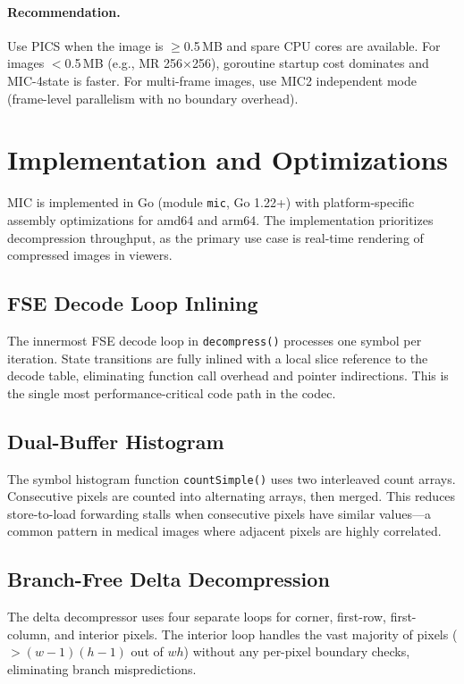 \documentclass[11pt,twocolumn]{article}
\begin{document}
\paragraph{Recommendation.}
Use PICS when the image is $\geq$0.5\,MB and spare CPU cores are available.
For images $<$0.5\,MB (e.g., MR 256$\times$256), goroutine startup cost dominates and MIC-4state is faster.
For multi-frame images, use MIC2 independent mode (frame-level parallelism with no boundary overhead).

\section{Implementation and Optimizations}
\label{sec:implementation}

MIC is implemented in Go (module \texttt{mic}, Go 1.22+) with platform-specific assembly optimizations for amd64 and arm64.
The implementation prioritizes decompression throughput, as the primary use case is real-time rendering of compressed images in viewers.

\subsection{FSE Decode Loop Inlining}

The innermost FSE decode loop in \texttt{decompress()} processes one symbol per iteration.
State transitions are fully inlined with a local slice reference to the decode table, eliminating function call overhead and pointer indirections.
This is the single most performance-critical code path in the codec.

\subsection{Dual-Buffer Histogram}

The symbol histogram function \texttt{countSimple()} uses two interleaved count arrays.
Consecutive pixels are counted into alternating arrays, then merged.
This reduces store-to-load forwarding stalls when consecutive pixels have similar values---a common pattern in medical images where adjacent pixels are highly correlated.

\subsection{Branch-Free Delta Decompression}

The delta decompressor uses four separate loops for corner, first-row, first-column, and interior pixels.
The interior loop handles the vast majority of pixels ($>(w{-}1)(h{-}1)$ out of $wh$) without any per-pixel boundary checks, eliminating branch mispredictions.
\end{document}
